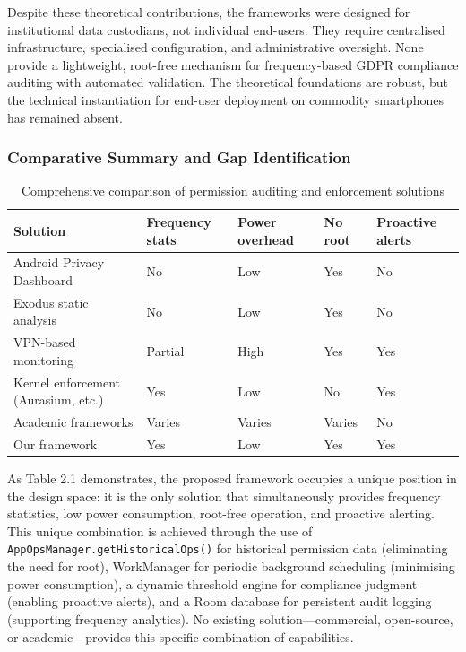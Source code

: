 Despite these theoretical contributions, the frameworks were designed for institutional data custodians, not individual end-users. They require centralised infrastructure, specialised configuration, and administrative oversight. None provide a lightweight, root-free mechanism for frequency-based GDPR compliance auditing with automated validation. The theoretical foundations are robust, but the technical instantiation for end-user deployment on commodity smartphones has remained absent.

\subsubsection{Comparative Summary and Gap Identification}
\begin{table}[H]
\centering
\caption{Comprehensive comparison of permission auditing and enforcement solutions}
\begin{tabular}{p{2.8cm}p{2.2cm}p{2.2cm}p{2.2cm}p{2.2cm}}
\toprule
\textbf{Solution} & \textbf{Frequency stats} & \textbf{Power overhead} & \textbf{No root} & \textbf{Proactive alerts} \\
\midrule
Android Privacy Dashboard & No & Low & Yes & No \\
Exodus static analysis & No & Low & Yes & No \\
VPN-based monitoring & Partial & High & Yes & Yes \\
Kernel enforcement (Aurasium, etc.) & Yes & Low & No & Yes \\
Academic frameworks & Varies & Varies & Varies & No \\
Our framework & Yes & Low & Yes & Yes \\
\bottomrule
\end{tabular}
\end{table}

As Table 2.1 demonstrates, the proposed framework occupies a unique position in the design space: it is the only solution that simultaneously provides frequency statistics, low power consumption, root-free operation, and proactive alerting. This unique combination is achieved through the use of \texttt{AppOpsManager.getHistoricalOps()} for historical permission data (eliminating the need for root), WorkManager for periodic background scheduling (minimising power consumption), a dynamic threshold engine for compliance judgment (enabling proactive alerts), and a Room database for persistent audit logging (supporting frequency analytics). No existing solution—commercial, open-source, or academic—provides this specific combination of capabilities.

